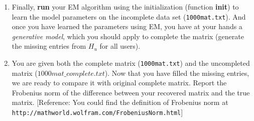 \begin{enumerate}
\begin{enumerate}
\item Finally, \textbf{run} your EM algorithm using the initialization (function \textbf{init}) to learn the model parameters on the incomplete data set (\texttt{1000mat.txt}). And once you have learned the parameters using EM, you have at your hands a \emph{generative model}, which you should apply to complete the matrix (generate the missing entries from $H_u$ for all users).

\item You are given both the complete matrix (\texttt{1000mat.txt}) and the uncompleted matrix (\texttt{$1000mat\_complete.txt$}). Now that you have filled the missing entries, we are ready to compare it with original complete matrix. Report the Frobenius norm of the difference between your recovered matrix and the true matrix. 
[Reference: You could find the definition of Frobenius norm at \texttt{http://mathworld.wolfram.com/FrobeniusNorm.html}]
    
\end{enumerate}


\end{enumerate}





 
